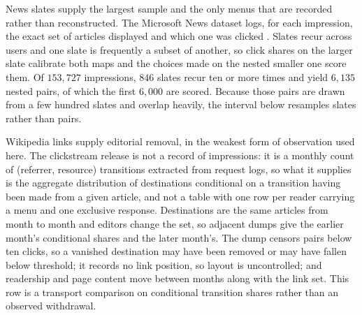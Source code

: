 \documentclass[11pt]{article}
\begin{document}
News slates supply the largest sample and the only menus that are recorded rather than
reconstructed. The Microsoft News dataset logs, for each impression, the exact set of
articles displayed and which one was clicked \cite{wu2020}. Slates recur across users and
one slate is frequently a subset of another, so click shares on the larger slate calibrate
both maps and the choices made on the nested smaller one score them. Of $153{,}727$
impressions, $846$ slates recur ten or more times and yield $6{,}135$ nested pairs, of which the first
$6{,}000$ are scored. Because
those pairs are drawn from a few hundred slates and overlap heavily, the interval below
resamples slates rather than pairs.

Wikipedia links supply editorial removal, in the weakest form of observation used here. The
clickstream release is not a record of impressions: it is a monthly count of (referrer, resource)
transitions extracted from request logs, so what it supplies is the aggregate distribution of
destinations conditional on a transition having been made from a given article, and not a table
with one row per reader carrying a menu and one exclusive response. Destinations are the same
articles from month to month and editors change the set, so adjacent dumps give the earlier
month's conditional shares and the later month's. The dump censors pairs below ten clicks, so a
vanished destination may have been removed or may have fallen below threshold; it records no link
position, so layout is uncontrolled; and readership and page content move between months along
with the link set. This row is a transport comparison on conditional transition shares rather
than an observed withdrawal.
\end{document}
